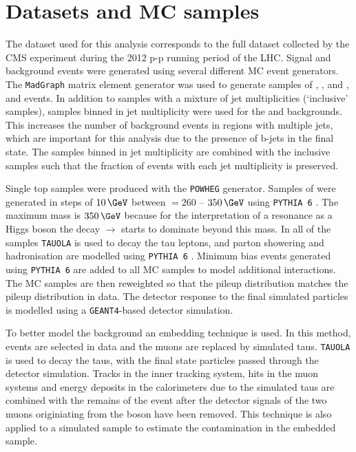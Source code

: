 \section{Datasets and \acl{MC} samples}
\label{sec:hhh_datasets}
The dataset used for this analysis corresponds to the full dataset collected by the CMS experiment during the 2012 p-p 
running period of the LHC. 
Signal and background events were generated using several different \ac{MC} event generators. The \texttt{MadGraph}
\cite{madgraph} matrix element generator was used to generate samples of \Wjets, \Zellell, \ttbar and \ZZ, \WZ and \WW
events. In addition to samples with a mixture of jet multiplicities (`inclusive' samples), samples binned in jet multiplicity
were used for the \Wjets and \Zellell backgrounds. This increases the number of background events
in regions with multiple jets, which are important for this analysis due to the presence of b-jets in the final state. 
The samples binned in jet multiplicity are combined with the
inclusive samples such that the fraction of events with each jet multiplicity is preserved.

Single top samples were produced with the \texttt{POWHEG} \cite{powheg1,powheg2} generator. Samples of \ggHtohhtobbtautau
were generated in steps of $10\,\GeV$ between \mH $= 260$ -- $350\,\GeV$ using \texttt{PYTHIA 6} \cite{pythia64}. The maximum
 mass is $350\,\GeV$ because for the interpretation of a resonance as a Higgs boson the decay \PHiggs $\rightarrow$ \ttbar
starts to dominate beyond this mass. In all of the samples
\texttt{TAUOLA} \cite{tauola} is used to decay the tau leptons, and parton showering and hadronisation are modelled using \texttt{PYTHIA 6} \cite{pythia64}.
Minimum bias events generated using \texttt{PYTHIA 6} are added to all \ac{MC} samples to model additional
interactions. The \ac{MC} samples are then reweighted so that the pileup distribution matches the
pileup distribution in data. The detector response to the final simulated particles is modelled using a \texttt{GEANT4}-based \cite{Geant4} detector simulation.

To better model the \Ztautau background an embedding technique is used. In this method, 
\Zmm events are selected in data and the muons are replaced by simulated taus. \texttt{TAUOLA} is used
to decay the taus, with the final state particles passed through the detector simulation. %
Tracks in the inner tracking system, hits in the muon systems and energy deposits in the calorimeters
due to the simulated taus are combined with the remains of the \Zmm event after the detector signals
of the two muons originiating from the \PZ boson have been removed. This technique is also applied to 
a simulated \ttbar sample to estimate the \ttbar contamination in the \Zmm embedded sample. %

